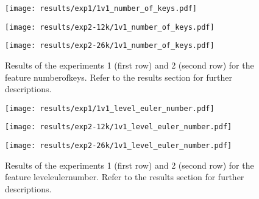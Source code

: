 \begin{figure}[h!]
	\centering
	\begin{minipage}{0.4\linewidth}
		\texttt{[image: results/exp1/1v1\_number\_of\_keys.pdf]}
	\end{minipage}
	
	\begin{minipage}{0.4\linewidth}
		\texttt{[image: results/exp2-12k/1v1\_number\_of\_keys.pdf]}
	\end{minipage}
	\begin{minipage}{0.4\linewidth}
		\texttt{[image: results/exp2-26k/1v1\_number\_of\_keys.pdf]}
	\end{minipage}
	
	\caption[ Results: Feature number\textunderscore of\textunderscore keys]{ Results of the experiments 1 (first row) and 2 (second row) for the feature number\textunderscore of\textunderscore keys. Refer to the results section for further descriptions. }
	\label{fig:appendix_number_of_keys}
\end{figure}

\begin{figure}[h!]
	\centering
	\begin{minipage}{0.4\linewidth}
		\texttt{[image: results/exp1/1v1\_level\_euler\_number.pdf]}
	\end{minipage}
	
	\begin{minipage}{0.4\linewidth}
		\texttt{[image: results/exp2-12k/1v1\_level\_euler\_number.pdf]}
	\end{minipage}
	\begin{minipage}{0.4\linewidth}
		\texttt{[image: results/exp2-26k/1v1\_level\_euler\_number.pdf]}
	\end{minipage}
	
	\caption[ Results: Feature level\textunderscore euler\textunderscore number]{ Results of the experiments 1 (first row) and 2 (second row) for the feature level\textunderscore euler\textunderscore number. Refer to the results section for further descriptions. }
	\label{fig:appendix_level_euler_number}
\end{figure}
\newpage 


